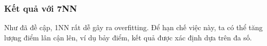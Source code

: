 








\subsubsection{Kết quả với 7NN}
Như đã đề cập, 1NN rất dễ gây ra overfitting. Để hạn chế việc này, ta có thể
tăng lượng điểm lân cận lên, ví dụ bảy điểm, kết quả được xác định dựa trên đa
số.

